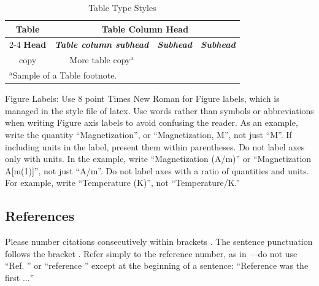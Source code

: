 \documentclass[a4paper, 10pt, conference]{ieeeconf}      %
\begin{document}
\begin{table}[t]%
\caption{Table Type Styles}
\begin{center}
\begin{tabular}{|c|c|c|c|}
\hline
\textbf{Table}&\multicolumn{3}{|c|}{\textbf{Table Column Head}} \\
\cline{2-4} 
\textbf{Head} & \textbf{\textit{Table column subhead}}& \textbf{\textit{Subhead}}& \textbf{\textit{Subhead}} \\
\hline
copy& More table copy$^{\mathrm{a}}$& &  \\
\hline
\multicolumn{4}{l}{$^{\mathrm{a}}$Sample of a Table footnote.}
\end{tabular}
\label{Table:ex1}
\end{center}
\end{table}


   

Figure Labels: Use 8 point Times New Roman for Figure labels, which is managed in the style file of latex. Use words rather than symbols or abbreviations when writing Figure axis labels to avoid confusing the reader. As an example, write the quantity ``Magnetization'', or ``Magnetization, M'', not just ``M''. If including units in the label, present them within parentheses. Do not label axes only with units. In the example, write ``Magnetization (A/m)'' or ``Magnetization {A[m(1)]}'', not just ``A/m''. Do not label axes with a ratio of quantities and units. For example, write ``Temperature (K)'', not ``Temperature/K.''

\subsection{References}

Please number citations consecutively within brackets \cite{schitterDesignModelingHighSpeed2007}. The 
sentence punctuation follows the bracket \cite{oppenheimSignalsSystems2nd1996}. Refer simply to the reference 
number, as in \cite{MunnigSchmidtMechatronics2nd2014}---do not use ``Ref. \cite{MunnigSchmidtMechatronics2nd2014}'' or ``reference \cite{MunnigSchmidtMechatronics2nd2014}'' except at 
the beginning of a sentence: ``Reference \cite{MunnigSchmidtMechatronics2nd2014} was the first $\ldots$''
\end{document}
